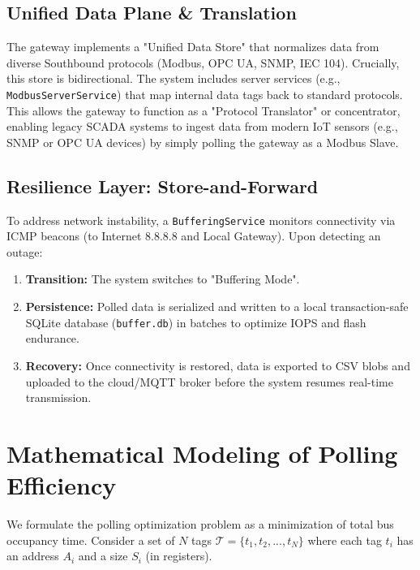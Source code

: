 \documentclass[journal]{IEEEtran}
\begin{document}
\subsection{Unified Data Plane \& Translation}
The gateway implements a "Unified Data Store" that normalizes data from diverse Southbound protocols (Modbus, OPC UA, SNMP, IEC 104). Crucially, this store is bidirectional. The system includes server services (e.g., \texttt{ModbusServerService}) that map internal data tags back to standard protocols. This allows the gateway to function as a "Protocol Translator" or concentrator, enabling legacy SCADA systems to ingest data from modern IoT sensors (e.g., SNMP or OPC UA devices) by simply polling the gateway as a Modbus Slave.

\subsection{Resilience Layer: Store-and-Forward}
To address network instability, a \texttt{BufferingService} monitors connectivity via ICMP beacons (to Internet 8.8.8.8 and Local Gateway). Upon detecting an outage:
\begin{enumerate}
    \item \textbf{Transition:} The system switches to "Buffering Mode".
    \item \textbf{Persistence:} Polled data is serialized and written to a local transaction-safe SQLite database (\texttt{buffer.db}) in batches to optimize IOPS and flash endurance.
    \item \textbf{Recovery:} Once connectivity is restored, data is exported to CSV blobs and uploaded to the cloud/MQTT broker before the system resumes real-time transmission.
\end{enumerate}

\section{Mathematical Modeling of Polling Efficiency}
We formulate the polling optimization problem as a minimization of total bus occupancy time. Consider a set of $N$ tags $\mathcal{T} = \{t_1, t_2, ..., t_N\}$ where each tag $t_i$ has an address $A_i$ and a size $S_i$ (in registers).
\end{document}
